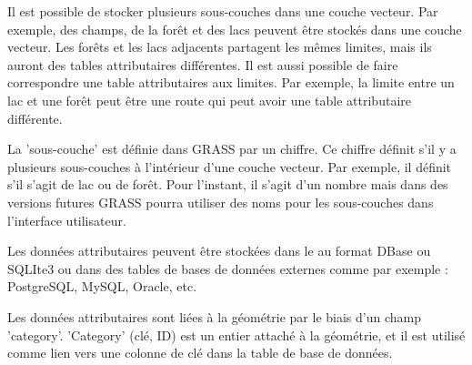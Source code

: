 Il est possible de stocker plusieurs sous-couches dans une couche vecteur. Par exemple, des champs, de la for\^et et des lacs peuvent \^etre stock\'es dans une couche vecteur. Les for\^ets et les lacs adjacents partagent les m\^emes limites, mais ils auront des tables attributaires diff\'erentes. Il est aussi possible de faire correspondre une table attributaires aux limites. Par exemple, la limite entre un lac et une for\^et peut \^etre une route qui peut avoir une table attributaire diff\'erente.

La 'sous-couche' est d\'efinie dans GRASS par un chiffre. Ce chiffre d\'efinit s'il y a plusieurs sous-couches \`a l'int\'erieur d'une couche vecteur. Par exemple, il d\'efinit s'il s'agit de lac ou de for\^et. Pour l'instant, il s'agit d'un nombre mais dans des versions futures GRASS pourra utiliser des noms pour les sous-couches dans l'interface utilisateur.

Les donn\'ees attributaires peuvent \^etre stock\'ees dans le  au format DBase ou SQLIte3 ou dans des tables de bases de donn\'ees externes comme par exemple : PostgreSQL, MySQL, Oracle, etc.

Les donn\'ees attributaires sont li\'ees \`a la g\'eom\'etrie par le biais d'un champ 'category'. 'Category' (cl\'e, ID) est un entier attach\'e \`a la g\'eom\'etrie, et il est utilis\'e comme lien vers une colonne de cl\'e dans la table de base de donn\'ees.


